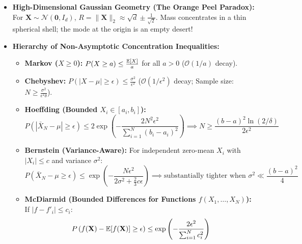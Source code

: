 \begin{tcolorbox}[breakable, colback=coralbg!30, colframe=coralborder, title={\large \textbf{7. GMMs, Expectation-Maximization \& Concentration Inequalities (Week 12)}}]
\begin{itemize}[leftmargin=*, noitemsep, topsep=2pt]
\begin{itemize}[leftmargin=*, noitemsep]
        \item \textbf{Monotonic Ascent Guarantee:} $\ell(\boldsymbol{\theta}^{(t+1)}) \ge \ell(\boldsymbol{\theta}^{(t)})$.
    \end{itemize}
    \item \textbf{High-Dimensional Gaussian Geometry (The Orange Peel Paradox):}
    For $\mathbf{X} \sim \mathcal{N}(\mathbf{0}, I_d)$, $R = \|\mathbf{X}\|_2 \approx \sqrt{d} \pm \frac{1}{\sqrt{2}}$. Mass concentrates in a thin spherical shell; the mode at the origin is an empty desert!
    \item \textbf{Hierarchy of Non-Asymptotic Concentration Inequalities:}
    \begin{itemize}[leftmargin=*, noitemsep]
        \item \textbf{Markov ($X \ge 0$):} $P(X \ge a) \le \frac{\operatorname{\mathbb{E}}[X]}{a}$ for all $a > 0$ ($\mathcal{O}(1/a)$ decay).
        \item \textbf{Chebyshev:} $P(|X - \mu| \ge \epsilon) \le \frac{\sigma^2}{\epsilon^2}$ ($\mathcal{O}(1/\epsilon^2)$ decay; Sample size: $N \ge \frac{\sigma^2}{\epsilon^2 \delta}$).
        \item \textbf{Hoeffding (Bounded $X_i \in [a_i, b_i]$):}
        \begin{equation*}
        P\left( |\bar{X}_N - \mu| \ge \epsilon \right) \le 2 \exp\left( -\frac{2 N^2 \epsilon^2}{\sum_{i=1}^N (b_i - a_i)^2} \right) \implies N \ge \frac{(b-a)^2 \ln(2/\delta)}{2\epsilon^2}
        \end{equation*}
        \item \textbf{Bernstein (Variance-Aware):} For independent zero-mean $X_i$ with $|X_i| \le c$ and variance $\sigma^2$:
        \begin{equation*}
        P\left( \bar{X}_N - \mu \ge \epsilon \right) \le \exp\left( -\frac{N\epsilon^2}{2\sigma^2 + \frac{2}{3}c\epsilon} \right) \implies \text{substantially tighter when } \sigma^2 \ll \frac{(b-a)^2}{4}
        \end{equation*}
        \item \textbf{McDiarmid (Bounded Differences for Functions $f(X_1, \dots, X_N)$):}
        If $|f - f'_i| \le c_i$:
        \begin{equation*}
        P\left( f(\mathbf{X}) - \operatorname{\mathbb{E}}[f(\mathbf{X})] \ge \epsilon \right) \le \exp\left( -\frac{2\epsilon^2}{\sum_{i=1}^N c_i^2} \right)
        \end{equation*}
    \end{itemize}
\end{itemize}
\end{tcolorbox}
